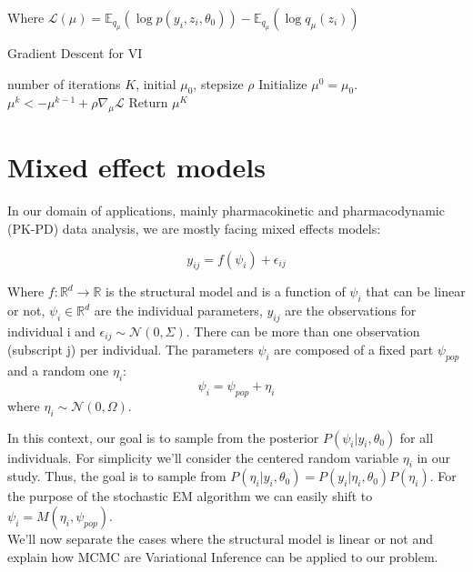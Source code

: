 \documentclass{article}
\begin{document}
Where $\mathcal{L}(\mu) = \mathbb{E}_{q_{\mu}}(\log p(y_i,z_i,\theta_0)) - \mathbb{E}_{q_{\mu}}(\log q_{\mu}(z_i))$

\begin{algorithm}[h]
   \caption{Gradient Descent for VI}
   \label{alg:VI}
\begin{algorithmic}
    number of iterations $K$, initial $\mu_0$, stepsize $\rho$
  \STATE Initialize $\mu^0 = \mu_0$.
   \STATE $\mu^k <- \mu^{k-1} + \rho \nabla_{\mu} \mathcal{L}$
   \ENDFOR
  \STATE Return $\mu^K$
\end{algorithmic}
\end{algorithm}


\section{Mixed effect models} 

In our domain of applications, mainly pharmacokinetic and pharmacodynamic (PK-PD) data analysis, we are mostly facing mixed effects models:

\begin{equation}
y_{ij} = f(\psi_i) + \epsilon_{ij}
\end{equation}

Where $f: \mathbb{R}^d \to \mathbb{R}$ is the structural model and is a function of $\psi_i$ that can be linear or not, $\psi_i \in \mathbb{R}^d$ are the individual parameters, $y_{ij}$ are the observations for individual i and $\epsilon_{ij} \sim \mathcal{N}(0,\Sigma)$. There can be more than one observation (subscript j) per individual. The parameters $\psi_i$ are composed of a fixed part $\psi_{pop}$ and a random one $\eta_i$:
\begin{equation}
\psi_i = \psi_{pop} + \eta_i 
\end{equation}
where $\eta_i \sim \mathcal{N}(0,\Omega)$.

In this context, our goal is to sample from the posterior $P(\psi_i|y_i,\theta_0)$ for all individuals. For simplicity we'll consider the centered random variable $\eta_i$ in our study. Thus, the goal is to sample from $P(\eta_i|y_i,\theta_0) = P(y_i|\eta_i,\theta_0)P(\eta_i)$. For the purpose of the stochastic EM algorithm we can easily shift to $\psi_i = M(\eta_i, \psi_{pop})$.\\
We'll now separate the cases where the structural model is linear or not and explain how MCMC are Variational Inference can be applied to our problem.
\end{document}

